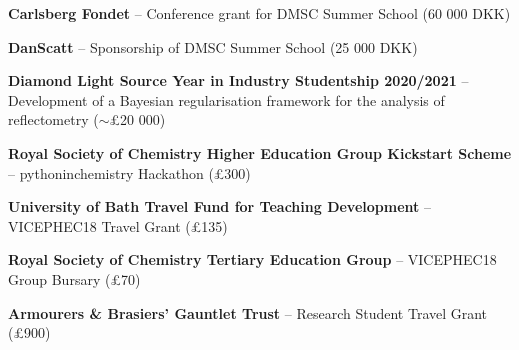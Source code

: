 \begin{cventriesy}
  \cventryy
    {
      \begin{cvitems}
        \item {\textbf{Carlsberg Fondet} -- Conference grant for DMSC Summer School (60 000 DKK)}
        \vspace{1mm}
        \item {\textbf{DanScatt} -- Sponsorship of DMSC Summer School (25 000 DKK)}
        \vspace{1mm}
        \item {\textbf{Diamond Light Source Year in Industry Studentship 2020/2021} -- Development of a Bayesian regularisation framework for the analysis of reflectometry ($\sim$£20 000)}
        \vspace{1mm}
        \item {\textbf{Royal Society of Chemistry Higher Education Group Kickstart Scheme} -- pythoninchemistry Hackathon (£300)}
        \vspace{1mm}
        \item {\textbf{University of Bath Travel Fund for Teaching Development} -- VICEPHEC18 Travel Grant (£135)}
        \vspace{1mm}
        \item {\textbf{Royal Society of Chemistry Tertiary Education Group} -- VICEPHEC18 Group Bursary (£70)}
        \vspace{1mm}
        \item {\textbf{Armourers \& Brasiers’ Gauntlet Trust} -- Research Student Travel Grant (£900)}
      \end{cvitems}
    }
\end{cventriesy}
